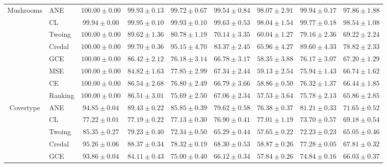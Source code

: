 \documentclass[letterpaper]{article} %
\begin{document}
\begin{table}[t]
\begin{tabular}{clccccccc}
\multirow{8}{*}{Mushrooms}
 & ANE    & $\mathbf{100.00 \pm 0.00}$ & $\mathbf{99.93 \pm 0.13}$ & $\mathbf{99.72 \pm 0.67}$ & $\mathbf{99.54 \pm 0.84}$ & $\mathbf{98.07 \pm 2.91}$ & $\mathbf{99.94 \pm 0.17}$ & $\mathbf{97.86 \pm 1.88}$ \\ 
 & CL     & $99.94 \pm 0.00$ & $\mathbf{99.95 \pm 0.10}$ & $\mathbf{99.93 \pm 0.10}$ & $\mathbf{99.63 \pm 0.53}$ & $\mathbf{98.04 \pm 1.54}$ & $\mathbf{99.77 \pm 0.18}$ & $\mathbf{98.54 \pm 1.08}$ \\ 
 & Twoing & $\mathbf{100.00 \pm 0.00}$ & $89.62 \pm 1.36$ & $80.78 \pm 1.19$ & $70.14 \pm 3.35$ & $60.04 \pm 1.27$ & $79.16 \pm 2.36$ & $69.22 \pm 2.24$ \\ 
 & Credal & $\mathbf{100.00 \pm 0.00}$ & $\mathbf{99.70 \pm 0.36}$ & $95.15 \pm 4.70$ & $83.37 \pm 2.45$ & $65.96 \pm 4.27$ & $89.60 \pm 4.33$ & $78.82 \pm 2.33$ \\ 
 & GCE    & $\mathbf{100.00 \pm 0.00}$ & $86.42 \pm 2.12$ & $76.18 \pm 3.14$ & $66.78 \pm 3.17$ & $58.35 \pm 3.88$ & $76.17 \pm 3.07$ & $67.20 \pm 1.29$ \\ 
 & MSE    & $\mathbf{100.00 \pm 0.00}$ & $84.82 \pm 1.63$ & $77.85 \pm 2.99$ & $67.34 \pm 2.44$ & $59.13 \pm 2.54$ & $75.94 \pm 1.43$ & $66.74 \pm 1.62$ \\ 
 & CE     & $\mathbf{100.00 \pm 0.00}$ & $86.54 \pm 2.68$ & $76.80 \pm 2.49$ & $66.79 \pm 3.66$ & $58.86 \pm 0.50$ & $76.32 \pm 1.37$ & $66.44 \pm 1.85$ \\ 
 & Ranking & $\mathbf{100.00 \pm 0.00}$ & $86.51 \pm 3.01$ & $75.69 \pm 2.50$ & $67.06 \pm 2.34$ & $57.53 \pm 3.64$ & $75.78 \pm 2.13$ & $65.86 \pm 2.85$ \\ 
\hline
\multirow{8}{*}{Covertype}
 & ANE    & $94.85 \pm 0.04$ & $\mathbf{89.43 \pm 0.22}$ & $\mathbf{85.85 \pm 0.39}$ & $\mathbf{79.62 \pm 0.58}$ & $\mathbf{76.38 \pm 0.37}$ & $\mathbf{81.21 \pm 0.33}$ & $\mathbf{71.65 \pm 0.52}$ \\ 
 & CL     & $77.22 \pm 0.01$ & $77.19 \pm 0.22$ & $77.13 \pm 0.30$ & $76.90 \pm 0.41$ & $\mathbf{77.01 \pm 1.19}$ & $73.70 \pm 0.57$ & $69.18 \pm 0.54$ \\ 
 & Twoing & $85.35 \pm 0.27$ & $79.23 \pm 0.40$ & $72.34 \pm 0.50$ & $65.29 \pm 0.44$ & $57.65 \pm 0.22$ & $72.23 \pm 0.23$ & $65.05 \pm 0.46$ \\ 
 & Credal & $95.26 \pm 0.06$ & $88.37 \pm 0.34$ & $78.32 \pm 0.19$ & $68.30 \pm 0.53$ & $58.87 \pm 0.26$ & $77.28 \pm 0.05$ & $67.81 \pm 0.32$ \\ 
 & GCE    & $93.86 \pm 0.04$ & $84.11 \pm 0.43$ & $75.00 \pm 0.40$ & $66.12 \pm 0.34$ & $57.84 \pm 0.26$ & $74.84 \pm 0.16$ & $66.03 \pm 0.37$ \\ 

\end{tabular}
\end{table}
\end{document}
